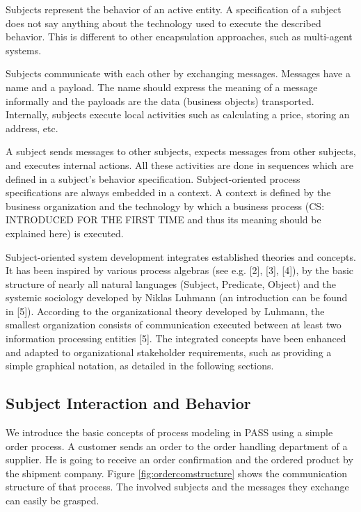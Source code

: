 Subjects represent the behavior of an active entity. A specification of a subject does not say anything about the technology used to execute the described behavior. This is different to other encapsulation approaches, such as multi-agent systems.

Subjects communicate with each other by exchanging messages. Messages have a name and a payload. The name should express the meaning of a message informally and the payloads are the data (business objects) transported. Internally, subjects execute local activities such as calculating a price, storing an address, etc.

A subject sends messages to other subjects, expects messages from other subjects, and executes internal actions. All these activities are done in sequences which are defined in a subject's behavior specification. Subject-oriented process specifications are always embedded in a context. A context is defined by the business organization and the technology by which a business process (CS: INTRODUCED FOR THE FIRST TIME and thus its meaning should be explained here) is executed.

Subject-oriented system development integrates established theories and concepts. It has been inspired by various process algebras (see e.g. [2], [3], [4]), by the basic structure of nearly all natural languages (Subject, Predicate, Object) and the systemic sociology developed by Niklas Luhmann (an introduction can be found in [5]). According to the organizational theory developed by Luhmann, the smallest organization consists of communication executed between at least two information processing entities [5]. The integrated concepts have been enhanced and adapted to organizational stakeholder requirements, such as providing a simple graphical notation, as detailed in the following sections.

\subsection{Subject Interaction and Behavior}

We introduce the basic concepts of process modeling in PASS using a simple order process. A customer sends an order to the order handling department of a supplier. He is going to receive an order confirmation and the ordered product by the shipment company. Figure \ref{fig:ordercomstructure} shows the communication structure of that process. The involved subjects and the messages they exchange can easily be grasped. 

